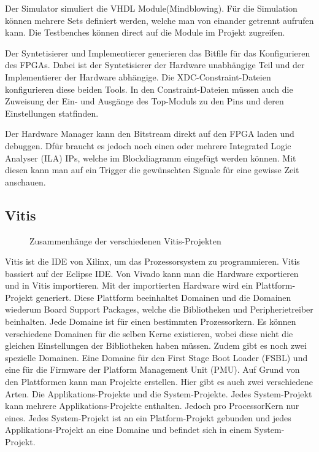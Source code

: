 \documentclass{article}
\begin{document}
Der Simulator simuliert die VHDL Module(Mindblowing). Für die Simulation können mehrere Sets definiert werden, welche man von einander getrennt aufrufen kann. Die Testbenches können direct auf die Module im Projekt zugreifen.  

Der Syntetisierer und Implementierer generieren das Bitfile für das Konfigurieren des FPGAs. Dabei ist der Syntetisierer der Hardware unabhängige Teil und der Implementierer der Hardware abhängige. Die XDC-Constraint-Dateien konfigurieren diese beiden Tools. In den Constraint-Dateien müssen auch die Zuweisung der Ein- und Ausgänge des Top-Moduls zu den Pins und deren Einstellungen statfinden. 

Der Hardware Manager kann den Bitstream direkt auf den FPGA laden und debuggen. Dfür braucht es jedoch noch einen oder mehrere Integrated Logic Analyser (ILA) IPs, welche im Blockdiagramm eingefügt werden können. Mit diesen kann man auf ein Trigger die gewünschten Signale für eine gewisse Zeit anschauen. 

\subsection{Vitis}

\begin{figure}[tb]
    \caption{Zusammenhänge der verschiedenen Vitis-Projekten}
    \label{fig:vitis}
\end{figure}

Vitis ist die IDE von Xilinx, um das Prozessorsystem zu programmieren. Vitis bassiert auf der Eclipse IDE. 
Von Vivado kann man die Hardware exportieren und in Vitis importieren. Mit der importierten Hardware wird ein Plattform-Projekt generiert. Diese Plattform beeinhaltet Domainen und die Domainen wiederum Board Support Packages, welche die Bibliotheken und Peripherietreiber beinhalten. Jede Domaine ist für einen bestimmten Prozessorkern. Es können verschiedene Domainen für die selben Kerne existieren, wobei diese nicht die gleichen Einstellungen der Bibliotheken haben müssen. Zudem gibt es noch zwei spezielle Domainen. Eine Domaine für den First Stage Boot Loader (FSBL) und eine für die Firmware der Platform Management Unit (PMU). Auf Grund von den Plattformen kann man Projekte erstellen. Hier gibt es auch zwei verschiedene Arten. Die Applikations-Projekte und die System-Projekte. Jedes System-Projekt kann mehrere Applikations-Projekte enthalten. Jedoch pro ProcessorKern nur eines. Jedes System-Projekt ist an ein Platform-Projekt gebunden und jedes Applikations-Projekt an eine Domaine und befindet sich in einem System-Projekt.
\end{document}
